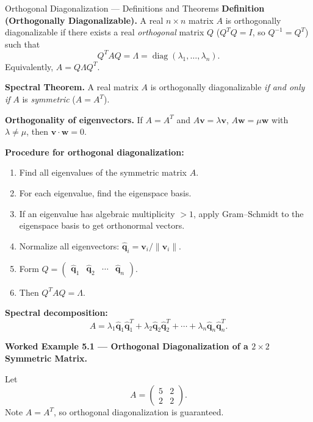 \documentclass[12pt,a4paper]{article}
\begin{document}
\begin{infobox}{Orthogonal Diagonalization --- Definitions and Theorems}
\textbf{Definition (Orthogonally Diagonalizable).}
A real $n\times n$ matrix $A$ is orthogonally diagonalizable if there exists a real \emph{orthogonal} matrix $Q$ ($Q^T Q = I$, so $Q^{-1} = Q^T$) such that
\[
  Q^T A Q = \Lambda = \operatorname{diag}(\lambda_1, \ldots, \lambda_n).
\]
Equivalently, $A = Q\Lambda Q^T$.

\textbf{Spectral Theorem.}
A real matrix $A$ is orthogonally diagonalizable \emph{if and only if} $A$ is \emph{symmetric} ($A = A^T$).

\textbf{Orthogonality of eigenvectors.}
If $A = A^T$ and $A\mathbf{v} = \lambda\mathbf{v}$, $A\mathbf{w} = \mu\mathbf{w}$ with $\lambda \neq \mu$, then $\mathbf{v} \cdot \mathbf{w} = 0$.

\textbf{Procedure for orthogonal diagonalization:}
\begin{enumerate}[leftmargin=*]
  \item Find all eigenvalues of the symmetric matrix $A$.
  \item For each eigenvalue, find the eigenspace basis.
  \item If an eigenvalue has algebraic multiplicity $> 1$, apply Gram--Schmidt to the eigenspace basis to get orthonormal vectors.
  \item Normalize all eigenvectors: $\hat{\mathbf{q}}_i = \mathbf{v}_i / \|\mathbf{v}_i\|$.
  \item Form $Q = \begin{pmatrix}\hat{\mathbf{q}}_1 & \hat{\mathbf{q}}_2 & \cdots & \hat{\mathbf{q}}_n\end{pmatrix}$.
  \item Then $Q^T A Q = \Lambda$.
\end{enumerate}

\textbf{Spectral decomposition:}
\[
  A = \lambda_1 \hat{\mathbf{q}}_1\hat{\mathbf{q}}_1^T + \lambda_2 \hat{\mathbf{q}}_2\hat{\mathbf{q}}_2^T + \cdots + \lambda_n \hat{\mathbf{q}}_n\hat{\mathbf{q}}_n^T.
\]
\end{infobox}

\textbf{Worked Example 5.1 --- Orthogonal Diagonalization of a $2\times 2$ Symmetric Matrix.}

Let
\[
  A = \begin{pmatrix} 5 & 2 \\ 2 & 2 \end{pmatrix}.
\]
Note $A = A^T$, so orthogonal diagonalization is guaranteed.
\end{document}
